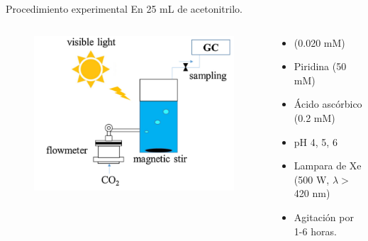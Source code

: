 \documentclass[handout]{beamer}
\begin{document}
\begin{frame}{Procedimiento experimental}
	En 25 mL de acetonitrilo.
	\begin{columns}
		\begin{column}{0.6\linewidth}
			\begin{figure}[h]
				\centering
				\includegraphics[width=\textwidth]{sources/reactor}
			\end{figure}
		\end{column}
		\begin{column}{0.4\linewidth}
			\footnotesize
			\begin{itemize}
				\item {} (0.020 mM)
				\item Piridina (50 mM)
				\item \'Acido asc\'orbico (0.2 mM)
			\end{itemize}
			\vspace{0.5cm}
			\begin{itemize}
				\item pH 4, 5, 6
				\item Lampara de Xe (500 W, $\lambda >$ 420 nm)
				\item Agitaci\'on por 1-6 horas.
			\end{itemize}
		\end{column}
	\end{columns}
\end{frame}
\end{document}
